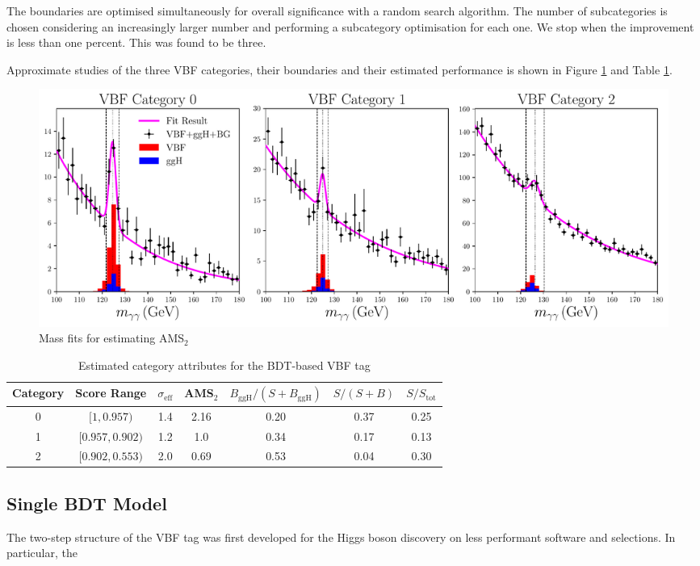 The boundaries are optimised simultaneously for overall significance with a random search algorithm. The number of subcategories is chosen considering an increasingly larger number and performing a subcategory optimisation for each one. We stop when the improvement is less than one percent. This was found to be three. 

Approximate studies of the three VBF categories, their boundaries and their estimated performance is shown in Figure \ref{fig:event_categorisaton:bdt_mass_fits} and Table \ref{tab:event_selection:legacy_cats}.
\begin{figure}[h!]
    \includegraphics[width=1.0\textwidth]{figures/event_selection/BDT_mass_fits.pdf}
    \caption{Mass fits for estimating AMS$_2$}
    \label{fig:event_categorisaton:bdt_mass_fits}
\end{figure}
\begin{table}[h!]
    \begin{tabular}{ c || c | c | c | c | c | c }
        Category & Score Range & $\sigma_{\mathrm{eff}}$ & AMS$_2$ & $B_{\mathrm{ggH}}/(S+B_{\mathrm{ggH}})$ & $S/(S+B)$ & $S/S_{\mathrm{tot}}$ \\
        \hline
        0 & $[1, 0.957)$     & 1.4 &  2.16 & 0.20 & 0.37 & 0.25 \\
        1 & $[0.957, 0.902)$ & 1.2 &  1.0  & 0.34 & 0.17 & 0.13 \\
        2 & $[0.902, 0.553)$ & 2.0 &  0.69 & 0.53 & 0.04 & 0.30 \\
\end{tabular}
    \caption{Estimated category attributes for the BDT-based VBF tag}
    \label{tab:event_selection:legacy_cats}
\end{table}









\subsection{Single BDT Model}
The two-step structure of the VBF tag was first developed for the Higgs boson discovery on less performant software and selections. 
In particular, the 

